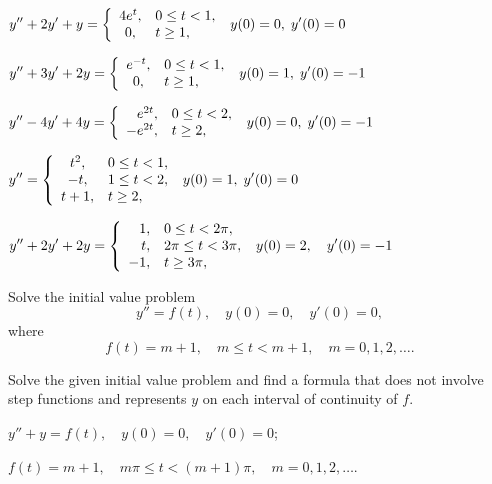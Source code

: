 \begin{exerciselist}
  \item\label{exer:8.5.16} $\displaystyle{y''+2y'+y=\left\{\begin{array}{cl}4e^{t},&0\le t<1,\\0,&t\ge1,\end{array}\right.\;y(0)=0,\; y'(0)=0}$

  \item\label{exer:8.5.17} $\displaystyle{y''+3y'+2y=\left\{\begin{array}{cl}e^{-t},&0\le t<1,\\0,&t\ge1,\end{array}\right.\;y(0)=1,\;y'(0)=-1}$

  \item\label{exer:8.5.18} $\displaystyle{y''-4y'+4y=\left\{\begin{array}{rl}e^{2t},&0\le t<2,\\-e^{2t},&t\ge2,\end{array}\right.\;y(0)=0,\; y'(0)=-1}$

  \item\label{exer:8.5.19} \CGex $\displaystyle{y''=\left\{\begin{array}{cl}t^{2},&0\le t<1,\\-t,&1\le t<2,\\t+1,&t\ge2,\end{array}\right.\;y(0)=1,\; y'(0)=0}$

  \item\label{exer:8.5.20} $\displaystyle{y''+2y'+2y=\left\{\begin{array}{rl}1,&0\le t<2\pi,\\t,&2\pi\le t<3\pi,\\-1,&t\ge3\pi,\end{array}\right.\; y(0)=2,\quad y'(0)=-1}$

  \item\label{exer:8.5.21} Solve the initial value problem
  \[
    y''=f(t),\quad y(0)=0,\quad y'(0)=0,
  \]
  where
  \[
    f(t)=m+1,\quad m\le t<m+1,\quad m=0,1,2,\dots.
  \]

  \item\label{exer:8.5.22} Solve the given initial value problem and find a formula that does not
        involve step functions and represents $y$ on each interval of continuity of $f$.
  \begin{alist}
    \item %
    $y''+y=f(t),\quad y(0)=0,\quad y'(0)=0$;

    $f(t)=m+1,\quad m\pi\le t<(m+1)\pi,\quad m=0,1,2,\dots$.


\end{alist}
\end{exerciselist}
